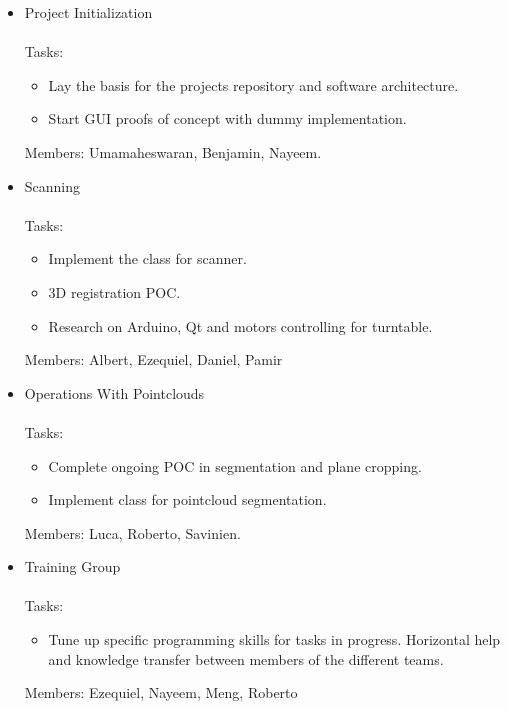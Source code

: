 \documentclass[11pt]{article} %
\begin{document}
\begin{itemize}
\item Project Initialization\\
~\\Tasks:
\begin{itemize}
\item Lay the basis for the projects repository and software architecture.
\item Start GUI proofs of concept with dummy implementation.
\end{itemize}
Members: Umamaheswaran, Benjamin, Nayeem.

\item Scanning ~\\
~\\Tasks:
\begin{itemize}
\item Implement the class for scanner.  
\item 3D registration POC.
\item Research on Arduino, Qt and motors controlling for turntable.
\end{itemize}
Members: Albert, Ezequiel, Daniel, Pamir
	

\item Operations With Pointclouds~\\
~\\Tasks:
\begin{itemize}
\item Complete ongoing POC in segmentation and plane cropping.
\item Implement class for pointcloud segmentation.
\end{itemize}
Members: Luca, Roberto, Savinien.


\item Training Group~\\
~\\Tasks:
\begin{itemize}
\item Tune up specific programming skills for tasks in progress. Horizontal help and knowledge transfer between members of the different teams. 
\end{itemize}
Members: Ezequiel, Nayeem, Meng, Roberto
\end{itemize}
\end{document}
